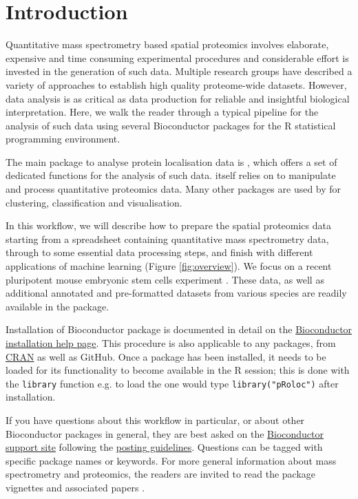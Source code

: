 


\section*{Introduction}

Quantitative mass spectrometry based spatial proteomics involves
elaborate, expensive and time consuming experimental procedures and
considerable effort is invested in the generation of such data.
Multiple research groups have described a variety of approaches to
establish high quality proteome-wide datasets. However, data analysis
is as critical as data production for reliable and insightful
biological interpretation. Here, we walk the reader through a typical
pipeline for the analysis of such data using several Bioconductor
packages for the R statistical programming environment.

The main package to analyse protein localisation data is
, which offers a set of dedicated functions for the
analysis of such data.  itself relies on
 to manipulate and process quantitative
proteomics data. Many other packages are used by 
for clustering, classification and visualisation.

In this workflow, we will describe how to prepare the spatial
proteomics data starting from a spreadsheet containing quantitative
mass spectrometry data, through to some essential data processing
steps, and finish with different applications of machine learning
(Figure \ref{fig:overview}). We focus on a recent pluripotent mouse
embryonic stem cells experiment \cite{hyper}. These data, as well as
additional annotated and pre-formatted datasets from various species
are readily available in the  package.

Installation of Bioconductor package is documented in detail on the
\href{http://bioconductor.org/install/#install-bioconductor-packages}{Bioconductor
  installation help page}. This procedure is also applicable to any
packages, from \href{https://cran.r-project.org/}{CRAN} as well as
GitHub. Once a package has been installed, it needs to be loaded for
its functionality to become available in the R session; this is done
with the \texttt{library} function e.g.  to load the
 one would type \texttt{library("pRoloc")}
after installation.

If you have questions about this workflow in particular, or about
other Bioconductor packages in general, they are best asked on the
\href{https://support.bioconductor.org/}{Bioconductor support site}
following the
\href{http://www.bioconductor.org/help/support/posting-guide/}{posting
  guidelines}. Questions can be tagged with specific package names or
keywords. For more general information about mass spectrometry and
proteomics, the readers are invited to read the
 package vignettes and associated
papers \cite{Gatto:2014,Gatto:2015}.


